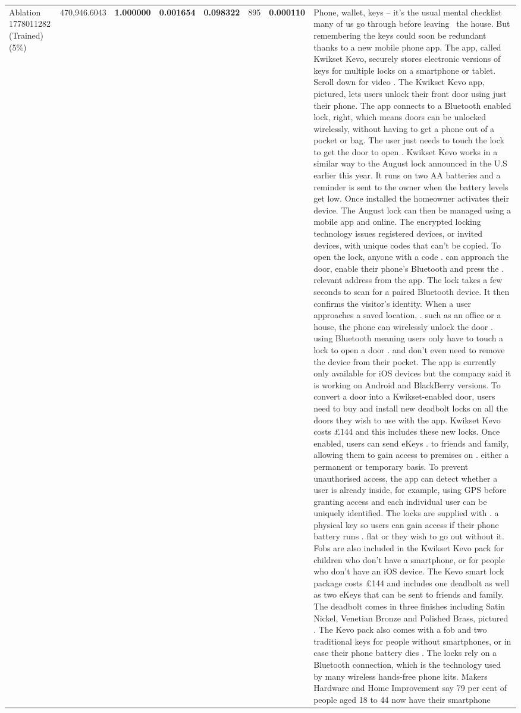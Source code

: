 \begin{table}[H]
\begin{tabular}{llrlllll}
Ablation 1778011282 (Trained) (5\%) & \color{red} 470,946.6043 & \bfseries \color{red} 1.000000 & \bfseries \color{red} 0.001654 & \bfseries \color{red} 0.098322 & \color{red} 895 & \bfseries \color{red} 0.000110 & Phone, wallet, keys – it’s the usual mental checklist many of us go through before leaving  the house. But remembering the keys could soon be redundant thanks to a new mobile phone app. The app, called Kwikset Kevo, securely stores electronic versions of keys for multiple locks on a smartphone or tablet. Scroll down for video . The Kwikset Kevo app, pictured, lets users unlock their front door using just their phone. The app connects to a Bluetooth enabled lock, right, which means doors can be unlocked wirelessly, without having to get a phone out of a pocket or bag. The user just needs to touch the lock to get the door to open . Kwikset Kevo works in a similar way to the August lock announced in the U.S earlier this year. It runs on two AA batteries and a reminder is sent to the owner when the battery levels get low. Once installed the homeowner activates their device. The August lock can then be managed using a mobile app and online. The encrypted locking technology issues registered devices, or invited devices, with unique codes that can't be copied. To open the lock, anyone with a code . can approach the door, enable their phone's Bluetooth and press the . relevant address from the app. The lock takes a few seconds to scan for a paired Bluetooth device. It then confirms the visitor's identity. When a user approaches a saved location, . such as an office or a house, the phone can wirelessly unlock the door . using Bluetooth meaning users only have to touch a lock to open a door . and don't even need to remove the device from their pocket. The app is currently only available for iOS devices but the company said it is working on Android and BlackBerry versions. To convert a door into a Kwikset-enabled door, users need to buy and install new deadbolt locks on all the doors they wish to use with the app. Kwikset Kevo costs £144 and this includes these new locks. Once enabled, users can send eKeys . to friends and family, allowing them to gain access to premises on . either a permanent or temporary basis. To prevent unauthorised access, the app can detect whether a user is already inside, for example, using GPS before granting access and each individual user can be uniquely identified. The locks are supplied with . a physical key so users can gain access if their phone battery runs . flat or they wish to go out without it. Fobs are also included in the Kwikset Kevo pack for children who don't have a smartphone, or for people who don't have an iOS device. The Kevo smart lock package costs £144 and includes one deadbolt as well as two eKeys that can be sent to friends and family. The deadbolt comes in three finishes including Satin Nickel, Venetian Bronze and Polished Brass, pictured . The Kevo pack also comes with a fob and two traditional keys for people without smartphones, or in case their phone battery dies . The locks rely on a Bluetooth connection, which is the technology used by many wireless hands-free phone kits. Makers Hardware and Home Improvement say 79 per cent of people aged 18 to 44 now have their smartphone 
\end{tabular}
\end{table}
